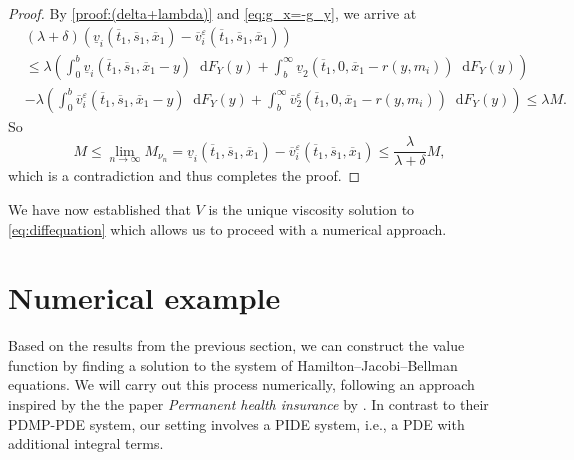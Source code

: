 \documentclass[a4paper]{scrartcl}
\theoremstyle{remark}
\theoremstyle{definition}
\numberwithin{equation}{section}
\newcommand*\diff{\mathop{}\!\mathrm{d}}
\begin{document}
\begin{proof}
By \eqref{proof:(delta+lambda)} and \eqref{eq:g_x=-g_y}, we arrive at
   \begin{align*}
         &(\lambda + \delta)(\underline{v}_i(\overline{t}_1,\overline{s}_1,\overline{x}_1)-\overline{v}^\varepsilon_i(\overline{t}_1,\overline{s}_1,\overline{x}_1)) \nonumber\\
        &\leq \lambda \left(\int_{0}^{b}\underline{v}_i(\overline{t}_1,\overline{s}_1,\overline{x}_1-y)\diff F_Y(y)  
   +\int_{b}^{\infty}\underline{v}_2(\overline{t}_1,0,\overline{x}_1-r(y,m_i))\diff F_Y(y)\right) \nonumber\\
   &-  \lambda \left(\int_{0}^{b}\overline{v}^\varepsilon_i(\overline{t}_1,\overline{s}_1,\overline{x}_1-y)\diff F_Y(y)  
    +\int_{b}^{\infty}\overline{v}^\varepsilon_2(\overline{t}_1,0,\overline{x}_1-r(y,m_i))\diff F_Y(y)\right) \leq \lambda M.
    \end{align*}
    So 
    \begin{equation*}
       M \leq \lim_{n \to \infty}M_{\nu_n} =\underline{v}_i(\overline{t}_1,\overline{s}_1,\overline{x}_1)-\overline{v}^\varepsilon_i(\overline{t}_1,\overline{s}_1,\overline{x}_1)\leq \frac{\lambda}{\lambda + \delta} M,
    \end{equation*}
    which is a contradiction and thus completes the proof.

\end{proof}

We have now established that $V$ is the unique viscosity solution to \eqref{eq:diffequation} which allows us to proceed with a numerical approach.


\section{Numerical example}
\label{sec:Numerics}
Based on the results from the previous section, we can construct the value function by finding a solution to the system of Hamilton–Jacobi–Bellman equations. We will carry out this process numerically, following an approach inspired by the the paper \textit{Permanent health insurance} by \cite{DavisHealthInsurance}. In contrast to their PDMP-PDE system, our setting involves a PIDE system, i.e., a PDE with additional integral terms.
\end{document}
